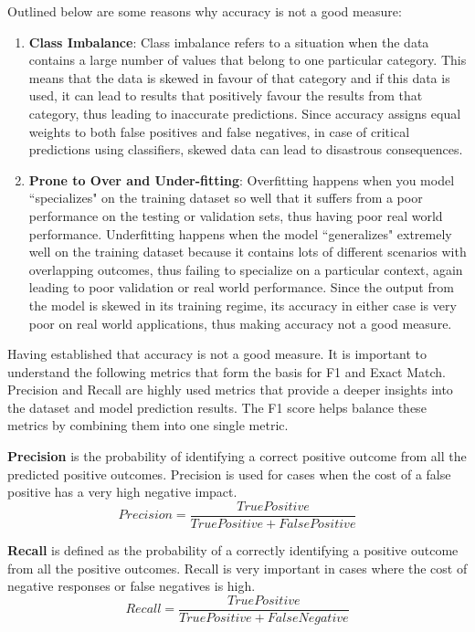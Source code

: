 \documentclass[a4paper,12pt]{report}
\begin{document}
		Outlined below are some reasons why accuracy is not a good measure:
		\begin{enumerate}
			\item \textbf{Class Imbalance}: Class imbalance refers to a situation when the data contains a large number of values that belong to one particular category. This means that the data is skewed in favour of that category and if this data is used, it can lead to results that positively favour the results from that category, thus leading to inaccurate predictions. Since accuracy assigns equal weights to both false positives and false negatives, in case of critical predictions using classifiers, skewed data can lead to disastrous consequences.
			\item \textbf{Prone to Over and Under-fitting}: Overfitting happens when you model ``specializes" on the training dataset so well that it suffers from a poor performance on the testing or validation sets, thus having poor real world performance. Underfitting happens when the model ``generalizes" extremely well on the training dataset because it contains lots of different scenarios with overlapping outcomes, thus failing to specialize on a particular context, again leading to poor validation or real world performance. Since the output from the model is skewed in its training regime, its accuracy in either case is very poor on real world applications, thus making accuracy not a good measure.
		\end{enumerate}

        Having established that accuracy is not a good measure. It is important to understand the following metrics that form the basis for F1 and Exact Match. Precision and Recall are highly used metrics that provide a deeper insights into the dataset and model prediction results. The F1 score helps balance these metrics by combining them into one single metric.


	\textbf{Precision} is the probability of identifying a correct positive outcome from all the predicted positive outcomes. Precision is used for cases when the cost of a false positive has a very high negative impact.
	\begin{equation}\label{precision}
		Precision = \dfrac{True Positive}{True Positive +  False Positive }
	\end{equation}

	\textbf{Recall} is defined as the probability of a correctly identifying a positive outcome from all the positive outcomes. Recall is very important in cases where the cost of negative responses or false negatives is high.
		\begin{equation}\label{recall}
		Recall = \dfrac{True Positive}{True Positive +  False Negative }
	\end{equation}
\end{document}
